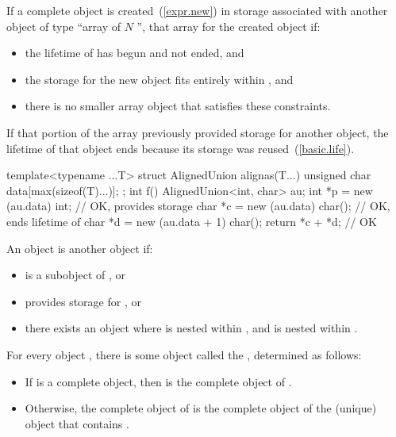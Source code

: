 \pnum
{}%
If a complete object is created~(\ref{expr.new})
in storage associated with another object 
of type ``array of $N$ '',
that array 
for the created object if:
\begin{itemize}
\item
the lifetime of  has begun and not ended, and
\item
the storage for the new object fits entirely within , and
\item
there is no smaller array object that satisfies these constraints.
\end{itemize}
\begin{note}
If that portion of the array
previously provided storage for another object,
the lifetime of that object ends
because its storage was reused~(\ref{basic.life}).
\end{note}
\begin{example}
\begin{codeblock}
template<typename ...T>
struct AlignedUnion {
  alignas(T...) unsigned char data[max(sizeof(T)...)];
};
int f() {
  AlignedUnion<int, char> au;
  int *p = new (au.data) int;     // OK,  provides storage
  char *c = new (au.data) char(); // OK, ends lifetime of 
  char *d = new (au.data + 1) char();
  return *c + *d; // OK
}
\end{codeblock}
\end{example}

\pnum
{}%
An object  is  another object  if:
\begin{itemize}
\item
{} is a subobject of , or
\item
{} provides storage for , or
\item
there exists an object 
where  is nested within ,
and  is nested within .
\end{itemize}

\pnum
For every object , there is some object called the
 , determined as follows:

\begin{itemize}

\item
If  is a complete object, then  is the complete
object of .

\item
Otherwise, the complete object of  is the complete object
of the (unique) object that contains .

\end{itemize}

